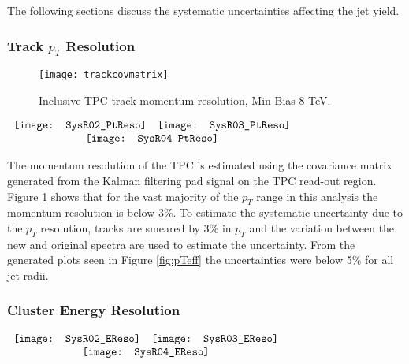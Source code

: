 The following sections discuss the systematic uncertainties affecting the jet yield.

\subsubsection{Track $p_{T}$ Resolution}

\begin{figure}[h]
\texttt{[image: trackcovmatrix]}
\centering
\caption{Inclusive TPC track momentum resolution, Min Bias 8 TeV.}
\label{fig:trackpcovmatrix}
\end{figure}

\begin{figure*}[t!]
$\begin{array}{rl}
    \texttt{[image: SysR02\_PtReso]} &
    \texttt{[image: SysR03\_PtReso]}\\
    \multicolumn{2}{c}{\texttt{[image: SysR04\_PtReso]}}
\end{array}$
\caption[Systematic due to $P_{T}$ resolution.]{\label{fig:pTeff}$P_{T}$ resolution systematic; R = 0.2 \textit{(top left)}, R = 0.3 \textit{(top right)}, R = 0.4 \textit{(bottom)}.}
\end{figure*}

\noindent
The momentum resolution of the TPC is estimated using the covariance matrix generated from the Kalman filtering\cite{Fruhwirth:1987fm} pad signal on the TPC read-out region.  Figure \ref{fig:trackpcovmatrix} shows that for the vast majority of the $p_{T}$ range in this analysis the  momentum resolution is below 3\%.  To estimate the systematic uncertainty due to the $p_{T}$ resolution, tracks are smeared by 3\% in $p_{T}$ and the variation between the new and original spectra are used to estimate the uncertainty.  From the generated plots seen in Figure \ref{fig:pTeff} the uncertainties were below 5\% for all jet radii.

\subsubsection{Cluster Energy Resolution}

\begin{figure*}[t!]
$\begin{array}{rl}
    \texttt{[image: SysR02\_EReso]} &
    \texttt{[image: SysR03\_EReso]}\\
    \multicolumn{2}{c}{\texttt{[image: SysR04\_EReso]}}
\end{array}$
\caption[Systematic due to energy resolution.]{\label{fig:Eeff}Systematic due to the energy resolution; R = 0.2 \textit{(top left)}, R = 0.3 \textit{(top right)}, R = 0.4 \textit{(bottom)}.}
\end{figure*}

